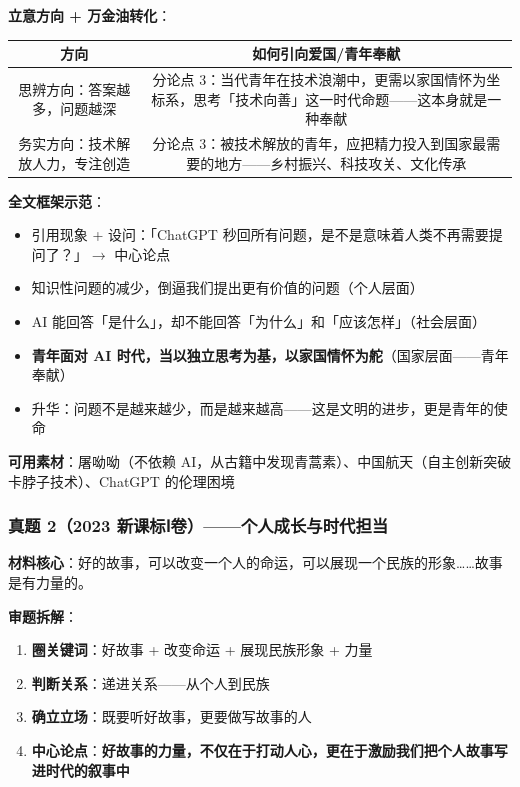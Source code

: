 \textbf{立意方向 + 万金油转化}：

\begin{center}
\begin{tabular}{c|c}
\textbf{方向} & \textbf{如何引向爱国/青年奉献} \\ \hline
思辨方向：答案越多，问题越深 & 分论点 3：当代青年在技术浪潮中，更需以家国情怀为坐标系，思考「技术向善」这一时代命题——这本身就是一种奉献 \\
务实方向：技术解放人力，专注创造 & 分论点 3：被技术解放的青年，应把精力投入到国家最需要的地方——乡村振兴、科技攻关、文化传承 \\
\end{tabular}
\end{center}

\textbf{全文框架示范}：

\begin{itemize}
  \item[\textbf{开头}] 引用现象 + 设问：「ChatGPT 秒回所有问题，是不是意味着人类不再需要提问了？」$\to$ 中心论点
  \item[\textbf{分论点 1}] 知识性问题的减少，倒逼我们提出更有价值的问题（个人层面）
  \item[\textbf{分论点 2}] AI 能回答「是什么」，却不能回答「为什么」和「应该怎样」（社会层面）
  \item[\textbf{分论点 3}] \textbf{青年面对 AI 时代，当以独立思考为基，以家国情怀为舵}（国家层面——青年奉献）
  \item[\textbf{结尾}] 升华：问题不是越来越少，而是越来越高——这是文明的进步，更是青年的使命
\end{itemize}

\textbf{可用素材}：屠呦呦（不依赖 AI，从古籍中发现青蒿素）、中国航天（自主创新突破卡脖子技术）、ChatGPT 的伦理困境

\subsubsection{真题 2（2023 新课标Ⅰ卷）——个人成长与时代担当}

\textbf{材料核心}：好的故事，可以改变一个人的命运，可以展现一个民族的形象……故事是有力量的。

\textbf{审题拆解}：

\begin{enumerate}
  \item \textbf{圈关键词}：好故事 + 改变命运 + 展现民族形象 + 力量
  \item \textbf{判断关系}：递进关系——从个人到民族
  \item \textbf{确立立场}：既要听好故事，更要做写故事的人
  \item \textbf{中心论点}：\textbf{好故事的力量，不仅在于打动人心，更在于激励我们把个人故事写进时代的叙事中}
\end{enumerate}

